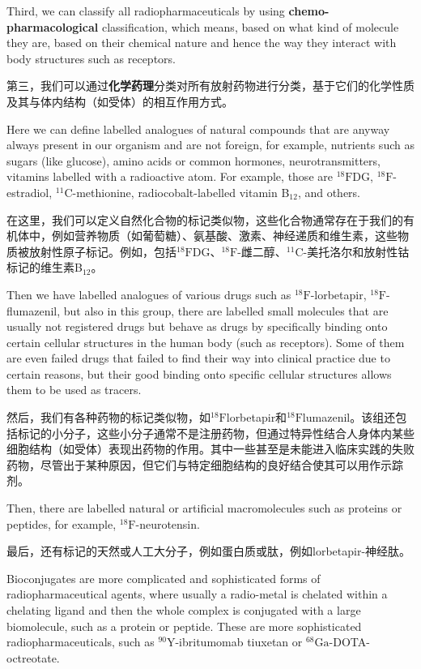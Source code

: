 \documentclass[dvipsnames, svgnames,a4paper,11pt]{article}
\begin{document}
Third, we can classify all radiopharmaceuticals by using \textbf{chemo-pharmacological} classification, which means, based on what kind of molecule they are, based on their chemical nature and hence the way they interact with body structures such as receptors.  

第三，我们可以通过\textbf{化学药理}分类对所有放射药物进行分类，基于它们的化学性质及其与体内结构（如受体）的相互作用方式。

Here we can define labelled analogues of natural compounds that are anyway always present in our organism and are not foreign, for example, nutrients such as sugars (like glucose), amino acids or common hormones, neurotransmitters, vitamins labelled with a radioactive atom. For example, those are \(\mathrm{^{18}FDG}\), \(\mathrm{^{18}F}\)-estradiol, \(\mathrm{^{11}C}\)-methionine, radiocobalt-labelled vitamin B${}_{12}$, and others.  

在这里，我们可以定义自然化合物的标记类似物，这些化合物通常存在于我们的有机体中，例如营养物质（如葡萄糖）、氨基酸、激素、神经递质和维生素，这些物质被放射性原子标记。例如，包括${}^\text{18}\text{F}$DG、${}^\text{18}\text{F}$-雌二醇、${}^\text{11}\text{C}$-美托洛尔和放射性钴标记的维生素B${}_{12}$。


Then we have labelled analogues of various drugs such as \(\mathrm{^{18}F}\)-lorbetapir, \(\mathrm{^{18}F}\)-flumazenil, but also in this group, there are labelled small molecules that are usually not registered drugs but behave as drugs by specifically binding onto certain cellular structures in the human body (such as receptors). Some of them are even failed drugs that failed to find their way into clinical practice due to certain reasons, but their good binding onto specific cellular structures allows them to be used as tracers.  

然后，我们有各种药物的标记类似物，如${}^\text{18}\text{F}$lorbetapir和${}^\text{18}\text{F}$lumazenil。该组还包括标记的小分子，这些小分子通常不是注册药物，但通过特异性结合人身体内某些细胞结构（如受体）表现出药物的作用。其中一些甚至是未能进入临床实践的失败药物，尽管出于某种原因，但它们与特定细胞结构的良好结合使其可以用作示踪剂。

Then, there are labelled natural or artificial macromolecules such as proteins or peptides, for example, \(\mathrm{^{18}F}\)-neurotensin.

最后，还有标记的天然或人工大分子，例如蛋白质或肽，例如lorbetapir-神经肽。

Bioconjugates are more complicated and sophisticated forms of radiopharmaceutical agents, where usually a radio-metal is chelated within a chelating ligand and then the whole complex is conjugated with a large biomolecule, such as a protein or peptide. These are more sophisticated radiopharmaceuticals, such as \(\mathrm{^{90}Y}\)-ibritumomab tiuxetan or \(\mathrm{^{68}Ga}\)-DOTA-octreotate.  
\end{document}
